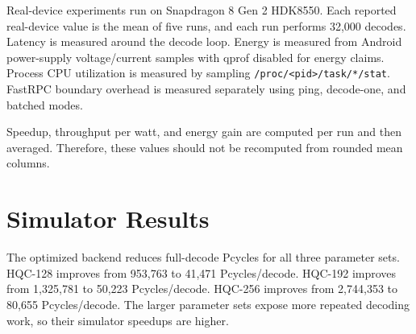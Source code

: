 \documentclass[12pt,a4paper]{report}
\begin{document}
Real-device experiments run on Snapdragon 8 Gen 2 HDK8550. Each reported real-device value is the mean of five runs, and each run performs 32,000 decodes. Latency is measured around the decode loop. Energy is measured from Android power-supply voltage/current samples with qprof disabled for energy claims. Process CPU utilization is measured by sampling \texttt{/proc/<pid>/task/*/stat}. FastRPC boundary overhead is measured separately using ping, decode-one, and batched modes.

Speedup, throughput per watt, and energy gain are computed per run and then averaged. Therefore, these values should not be recomputed from rounded mean columns.

\section{Simulator Results}
\begin{table}[h]
\centering
\caption{Paired Hexagon simulator measurements for full HQC decoding.}
\label{tab:sim-full}
\end{table}

The optimized backend reduces full-decode Pcycles for all three parameter sets. HQC-128 improves from 953,763 to 41,471 Pcycles/decode. HQC-192 improves from 1,325,781 to 50,223 Pcycles/decode. HQC-256 improves from 2,744,353 to 80,655 Pcycles/decode. The larger parameter sets expose more repeated decoding work, so their simulator speedups are higher.
\end{document}
